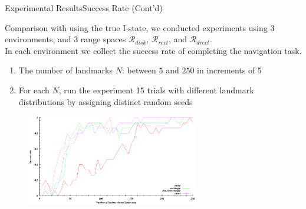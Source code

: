\begin{frame}{Experimental Results}{Success Rate (Cont'd)}
 \small{Comparison with using the true I-state, we conducted experiments using 3
 environments, and 3 range spaces $\mathcal{R}_{disk}$, $\mathcal{R}_{rect}$,
 and  $\mathcal{R}_{drect}$. \\
 In each environment we collect the success rate of completing the navigation
 task. 
 \begin{enumerate}
 \item The number of landmarks $N$: between $5$ and $250$ in increments of 5
 \item For each $N$, run the experiment 15 trials with different landmark
   distributions by assigning distinct random seeds
 \end{enumerate}
}
\begin{figure}
  \centering
  \includegraphics[width=0.67\textwidth]{Data/expnumclutter}
\end{figure}
\end{frame}